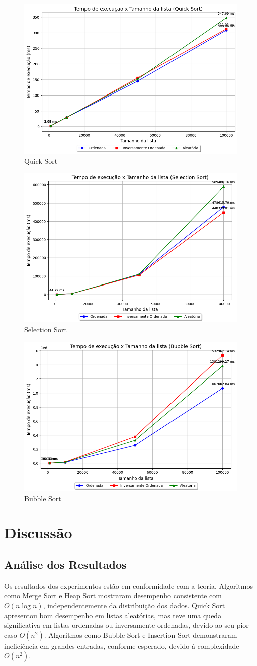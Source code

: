 \documentclass[tcc1,project]{uftex}
\begin{document}
\begin{figure}[!h]
    \centering
    \includegraphics[width=0.5\linewidth]{graficos-tempo/grafico_Quick Sort.png}
    \caption{Quick Sort}
    \label{fig:quick-sort-tempo}
\end{figure}

\begin{figure}[!h]
    \centering
    \includegraphics[width=0.5\linewidth]{graficos-tempo/grafico_Selection Sort.png}
    \caption{Selection Sort}
    \label{fig:selection-sort-tempo}
\end{figure}

\begin{figure}[!h]
    \centering
    \includegraphics[width=0.5\linewidth]{graficos-tempo/grafico_Bubble Sort.png}
    \caption{Bubble Sort}
    \label{fig:selection-sort-tempo}
\end{figure}


\section{Discussão}

\subsection{Análise dos Resultados}
Os resultados dos experimentos estão em conformidade com a teoria. Algoritmos como Merge Sort e Heap Sort mostraram desempenho consistente com $O(n \log n)$, independentemente da distribuição dos dados. Quick Sort apresentou bom desempenho em listas aleatórias, mas teve uma queda significativa em listas ordenadas ou inversamente ordenadas, devido ao seu pior caso $O(n^2)$. Algoritmos como Bubble Sort e Insertion Sort demonstraram ineficiência em grandes entradas, conforme esperado, devido à complexidade $O(n^2)$.
\end{document}
